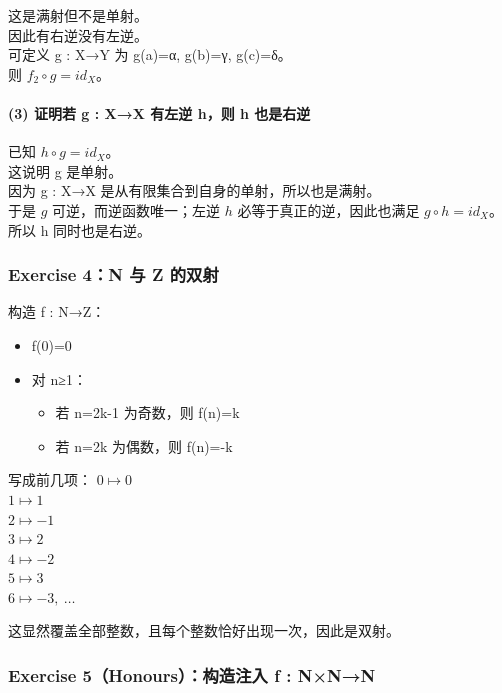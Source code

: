 \documentclass[
  11pt,
]{article}
\providecommand{\tightlist}{%
  \setlength{\itemsep}{0pt}\setlength{\parskip}{0pt}}
\begin{document}
这是满射但不是单射。\\
因此有右逆没有左逆。\\
可定义 g : X→Y 为 g(a)=α, g(b)=γ, g(c)=δ。\\
则 \(f_2\circ g = id_X\)。

\paragraph{(3) 证明若 g : X→X 有左逆 h，则 h
也是右逆}\label{ux8bc1ux660eux82e5-g-xx-ux6709ux5de6ux9006-hux5219-h-ux4e5fux662fux53f3ux9006}

已知 \(h\circ g = id_X\)。\\
这说明 g 是单射。\\
因为 g : X→X 是从有限集合到自身的单射，所以也是满射。\\
于是 \(g\) 可逆，而逆函数唯一；左逆 \(h\) 必等于真正的逆，因此也满足
\(g\circ h = id_X\)。\\
所以 h 同时也是右逆。

\subsubsection{Exercise 4：N 与 Z
的双射}\label{exercise-4n-ux4e0e-z-ux7684ux53ccux5c04}

构造 f : N→Z：

\begin{itemize}
\tightlist
\item
  f(0)=0
\item
  对 n≥1：

  \begin{itemize}
  \tightlist
  \item
    若 n=2k-1 为奇数，则 f(n)=k
  \item
    若 n=2k 为偶数，则 f(n)=-k
  \end{itemize}
\end{itemize}

写成前几项： \(0 \mapsto 0\)\\
\(1 \mapsto 1\)\\
\(2 \mapsto -1\)\\
\(3 \mapsto 2\)\\
\(4 \mapsto -2\)\\
\(5 \mapsto 3\)\\
\(6 \mapsto -3,\ \dots\)

这显然覆盖全部整数，且每个整数恰好出现一次，因此是双射。

\subsubsection{Exercise 5（Honours）：构造注入 f :
N×N→N}\label{exercise-5honoursux6784ux9020ux6ce8ux5165-f-nnn}
\end{document}
